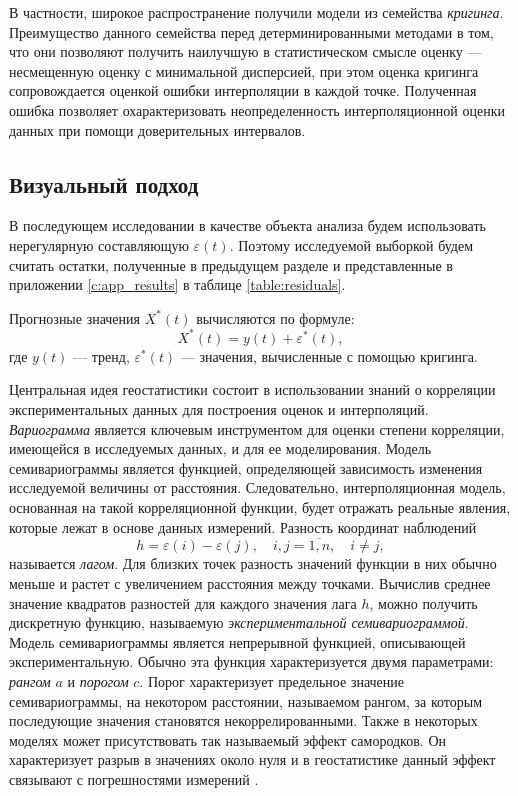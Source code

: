 В частности, широкое распространение получили модели из семейства \textit{кригинга}. Преимущество данного семейства перед детерминированными методами в том, что они позволяют получить наилучшую в статистическом смысле оценку  --- несмещенную оценку с минимальной дисперсией, при этом оценка кригинга сопровождается оценкой ошибки интерполяции в каждой точке. Полученная ошибка позволяет охарактеризовать неопределенность интерполяционной оценки данных при помощи доверительных интервалов.

\subsection{Визуальный подход} %
\label{sec:_variogram}
В последующем исследовании в качестве объекта анализа будем использовать нерегулярную составляющую $ \varepsilon(t) $. Поэтому исследуемой выборкой будем считать остатки, полученные в предыдущем разделе и представленные в приложении \ref{c:app_results} в таблице \ref{table:residuals}.

Прогнозные значения $ X^{*}(t) $ вычисляются по формуле:
\begin{equation*}
	X^{*}(t) = y(t) + \varepsilon^{*}(t),
\end{equation*}
где $ y(t) $ --- тренд, $ \varepsilon^{*}(t) $ --- значения, вычисленные с помощью кригинга.

Центральная идея геостатистики состоит в использовании знаний о корреляции экспериментальных данных для построения оценок и интерполяций. \textit{Вариограмма} является ключевым инструментом для оценки степени корреляции, имеющейся в исследуемых данных, и для ее моделирования. Модель семивариограммы является функцией, определяющей зависимость изменения исследуемой величины от расстояния. Следовательно, интерполяционная модель, основанная на такой корреляционной функции, будет отражать реальные явления, которые лежат в основе данных измерений. Разность координат наблюдений
\begin{equation*}
	h = \varepsilon(i) - \varepsilon(j), \quad i, j = \overline{1,n}, \quad i \neq j,
\end{equation*}
называется \textit{лагом}. Для близких точек разность значений функции в них обычно меньше и растет с увеличением расстояния между точками. Вычислив среднее значение квадратов разностей для каждого значения лага $h$, можно получить дискретную функцию, называемую \textit{экспериментальной семивариограммой}. Модель семивариограммы является непрерывной функцией, описывающей экспериментальную. Обычно эта функция характеризуется двумя параметрами: \textit{рангом} $ a $ и \textit{порогом} $ c $. Порог характеризует предельное значение семивариограммы, на некотором расстоянии, называемом рангом, за которым последующие значения становятся некоррелированными. Также в некоторых моделях может присутствовать так называемый эффект самородков. Он характеризует разрыв в значениях около нуля и в геостатистике данный эффект связывают с погрешностями измерений \cite{saveliev2012}.

